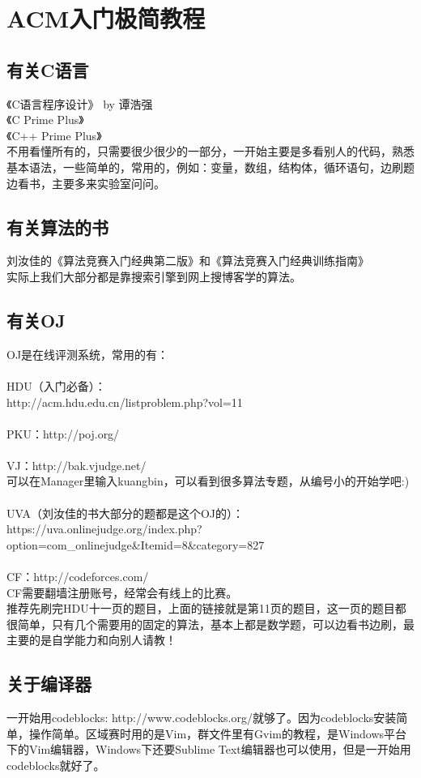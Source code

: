



\chapter{ACM入门极简教程}

\section{有关C语言}

\noindent 《C语言程序设计》 by 谭浩强 \\
《C Prime Plus》 \\
《C++ Prime Plus》 \\

不用看懂所有的，只需要很少很少的一部分，一开始主要是多看别人的代码，熟悉基本语法，一些简单的，常用的，例如：变量，数组，结构体，循环语句，边刷题边看书，主要多来实验室问问。

\section{有关算法的书}

\noindent 刘汝佳的《算法竞赛入门经典第二版》和《算法竞赛入门经典训练指南》 \\
实际上我们大部分都是靠搜索引擎到网上搜博客学的算法。

\section{有关OJ}

\noindent OJ是在线评测系统，常用的有： \\
\\
HDU（入门必备）：\\
http://acm.hdu.edu.cn/listproblem.php?vol=11 \\ 
\\ 
PKU：http://poj.org/  \\
\\
VJ：http://bak.vjudge.net/ \\
可以在Manager里输入kuangbin，可以看到很多算法专题，从编号小的开始学吧:) \\ 
\\
UVA（刘汝佳的书大部分的题都是这个OJ的）： \\
https://uva.onlinejudge.org/index.php?option=com\_onlinejudge\&Itemid=8\&category=827 \\
\\
CF：http://codeforces.com/ \\
CF需要翻墙注册账号，经常会有线上的比赛。 \\

推荐先刷完HDU十一页的题目，上面的链接就是第11页的题目，这一页的题目都很简单，只有几个需要用的固定的算法，基本上都是数学题，可以边看书边刷，最主要的是自学能力和向别人请教！ \\

\section{关于编译器}
一开始用codeblocks: http://www.codeblocks.org/就够了。因为codeblocks安装简单，操作简单。区域赛时用的是Vim，群文件里有Gvim的教程，是Windows平台下的Vim编辑器，Windows下还要Sublime Text编辑器也可以使用，但是一开始用codeblocks就好了。

